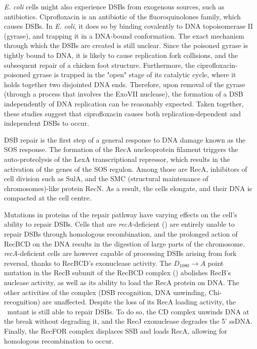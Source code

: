 \emph{E. coli} cells might also experience DSBs from exo\-genous sources, such as anti\-biotics. Ciprofloxacin is an antibiotic of the fluoro\-quinolones family, which causes DSBs. In \emph{E. coli}, it does so by binding covalently to DNA topoisomerase II (gyrase), and trapping it in a DNA-bound conformation\cite{Kohanski2010}. The exact mechanism through which the DSBs are created is still unclear. Since the poisoned gyrase is tightly bound to DNA, it is likely to cause replication fork collisions\cite{Wentzell2000, Drlica2008}, and the subsequent repair of a chicken foot structure. Furthermore, the ciprofloxacin-poisoned gyrase is trapped in the "open" stage of its catalytic cycle, where it holds together two disjointed DNA ends. Therefore, upon removal of the gyrase (through a process that involves the ExoVII nuclease\cite{Huang2021}), the formation of a DSB independently of DNA replication can be reasonably expected\cite{Zhao2006}. Taken together, these studies suggest that ciprofloxacin causes both replication-dependent and independent DSBs to occur.

DSB repair is the first step of a general response to DNA damage known as the SOS response\cite{Baharoglu2014}. The formation of the RecA nucleoprotein filament triggers the auto-proteolysis of the LexA transcriptional repressor, which results in the activation of the genes of the SOS regulon. Among those are RecA, inhibitors of cell division such as SulA, and the SMC (structural maintenance of chromosomes)-like protein RecN. As a result, the cells elongate\cite{Bos2015}, and their DNA is compacted at the cell centre\cite{Odsbu2014}.

Mutations in proteins of the repair pathway have varying effects on the cell's ability to repair DSBs. Cells that are \emph{recA}-deficient (\dreca) are entirely unable to repair DSBs through homologous recombination, and the prolonged action of RecBCD on the DNA results in the digestion of large parts of the chromosome\cite{Horii1968, Chow2007}. \emph{recA}-deficient cells are however capable of processing DSBs arising from fork reversal, thanks to RecBCD's exonuclease activity\cite{Seigneur1998, Michel2001}. The $D_{1080} \rightarrow A$ point mutation in the RecB subunit of the RecBCD complex (\teneighty) abolishes RecB's nuclease activity, as well as its ability to load the RecA protein on DNA\cite{Yu1998, Wang2000}. The other activities of the complex (DSB recognition, DNA unwinding, Chi-recognition) are unaffected\cite{Anderson1999}. Despite the loss of its RecA loading activity, the \teneighty\ mutant is still able to repair DSBs. To do so, the \teneighty CD complex unwinds DNA at the break without degrading it, and the RecJ exonuclease degrades the 5' ssDNA. Finally, the RecFOR complex displaces SSB and loads RecA, allowing for homologous recombination to occur\cite{Ivancic-Bace_2003}.

